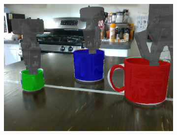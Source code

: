 \documentclass{article}
\begin{document}
\begin{figure}[]
\begin{subfigure}{(\linewidth - 0.05\linewidth)/5}
        \includegraphics[width=\linewidth]{figures/real2sim2real/2/4.png}
    \end{subfigure}


\end{figure}
\end{document}
